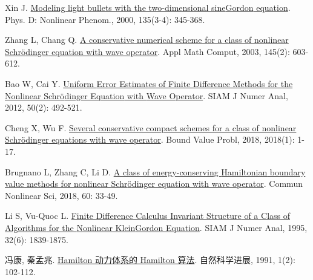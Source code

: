 \begin{thebibliography}{79}
    Xin J.
    \newblock \href{https://linkinghub.elsevier.com/retrieve/pii/S0167278999001281}{Modeling light bullets with the two-dimensional sine{\textendash}{{Gordon}} equation}\allowbreak[J].
    \newblock Phys. D: Nonlinear Phenom., 2000, 135\allowbreak (3-4): 345-368.
    
    Zhang L, Chang Q.
    \newblock \href{https://www.sciencedirect.com/science/article/pii/S0096300302008421}{A conservative numerical scheme for a class of nonlinear {{Schr{\"o}dinger}} equation with wave operator}\allowbreak[J].
    \newblock Appl Math Comput, 2003, 145\allowbreak (2): 603-612.
    
    Bao W, Cai Y.
    \newblock \href{https://epubs.siam.org/doi/10.1137/110830800}{Uniform {{Error Estimates}} of {{Finite Difference Methods}} for the {{Nonlinear Schr{\"o}dinger Equation}} with {{Wave Operator}}}\allowbreak[J].
    \newblock SIAM J Numer Anal, 2012, 50\allowbreak (2): 492-521.
    
    Cheng X, Wu F.
    \newblock \href{https://boundaryvalueproblems.springeropen.com/articles/10.1186/s13661-018-0956-4}{Several conservative compact schemes for a class of nonlinear {{Schr{\"o}dinger}} equations with wave operator}\allowbreak[J].
    \newblock Bound Value Probl, 2018, 2018\allowbreak (1): 1-17.
    
    Brugnano L, Zhang C, Li D.
    \newblock \href{https://linkinghub.elsevier.com/retrieve/pii/S1007570417304409}{A class of energy-conserving {{Hamiltonian}} boundary value methods for nonlinear {{Schr{\"o}dinger}} equation with wave operator}\allowbreak[J].
    \newblock Commun Nonlinear Sci, 2018, 60: 33-49.
    
    Li S, {Vu-Quoc} L.
    \newblock \href{https://epubs.siam.org/doi/10.1137/0732083}{Finite {{Difference Calculus Invariant Structure}} of a {{Class}} of {{Algorithms}} for the {{Nonlinear Klein}}{\textendash}{{Gordon Equation}}}\allowbreak[J].
    \newblock SIAM J Numer Anal, 1995, 32\allowbreak (6): 1839-1875.
    
    冯康, 秦孟兆.
    \newblock \href{https://linkinghub.elsevier.com/retrieve/pii/S0096300318304983}{Hamilton 动力体系的 Hamilton 算法}\allowbreak[J].
    \newblock 自然科学进展, 1991, 1(2): 102-112.


\end{thebibliography}
